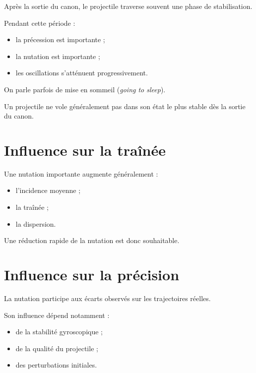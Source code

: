 Après la sortie du canon, le projectile traverse souvent une phase de
stabilisation.

Pendant cette période :

\begin{itemize}
    \item la précession est importante ;
    \item la nutation est importante ;
    \item les oscillations s'atténuent progressivement.
\end{itemize}

On parle parfois de mise en sommeil (\emph{going to sleep}).

\begin{aretenir}

Un projectile ne vole généralement pas dans son état le plus stable dès la
sortie du canon.

\end{aretenir}

\section{Influence sur la traînée}

Une nutation importante augmente généralement :

\begin{itemize}
    \item l'incidence moyenne ;
    \item la traînée ;
    \item la dispersion.
\end{itemize}

Une réduction rapide de la nutation est donc souhaitable.

\section{Influence sur la précision}

La nutation participe aux écarts observés sur les trajectoires réelles.

Son influence dépend notamment :

\begin{itemize}
    \item de la stabilité gyroscopique ;
    \item de la qualité du projectile ;
    \item des perturbations initiales.
\end{itemize}

